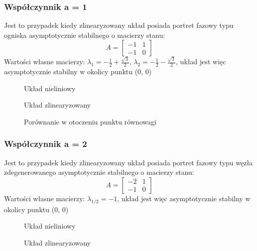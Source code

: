 \documentclass[a4paper, 10pt]{article}
\begin{document}
			\subsubsection{Współczynnik a = 1}
				Jest to przypadek kiedy zlinearyzowany układ posiada portret fazowy typu ogniska asymptotycznie stabilnego o macierzy stanu:
				$$
				A = \begin{bmatrix}
					-1 & 1 \\
					-1 & 0
				\end{bmatrix}
				$$
				Wartości własne macierzy: $\lambda_1 = -\frac{1}{2} + \frac{\sqrt{3}}{2}$, $\lambda_2 = -\frac{1}{2} - \frac{\sqrt{3}}{2}$, układ jest więc asymptotycznie stabilny w okolicy punktu (0, 0)
				\begin{figure}[H]
					\centering
					\def \svgwidth{0.75\columnwidth}
					
					\caption{Układ nieliniowy}
				\end{figure}\noindent


				\begin{figure}[H]
					\centering
					\def \svgwidth{0.75\columnwidth}
					
					\caption{Układ zlinearyzowany}
				\end{figure}\noindent

				\begin{figure}[H]
					\centering
					\def \svgwidth{0.75\columnwidth}
					
					\caption{Porównanie w otoczeniu punktu równowagi}
				\end{figure}\noindent
			\subsubsection{Współczynnik a = 2}
					Jest to przypadek kiedy zlinearyzowany układ posiada portret fazowy typu węzła zdegenerowanego asymptotycznie stabilnego o macierzy stanu:
					$$
					A = \begin{bmatrix}
					-2 & 1 \\
					-1 & 0
					\end{bmatrix}
					$$
					Wartości własne macierzy: $\lambda_{1/2} = -1$, układ jest więc asymptotycznie stabilny w okolicy punktu (0, 0)
				\begin{figure}[H]
					\centering
					\def \svgwidth{0.7\columnwidth}
					
					\caption{Układ nieliniowy}
				\end{figure}\noindent
				
				\begin{figure}[H]
					\centering
					\def \svgwidth{0.7\columnwidth}
					
					\caption{Układ zlinearyzowany}
				\end{figure}\noindent
				
\end{document}
